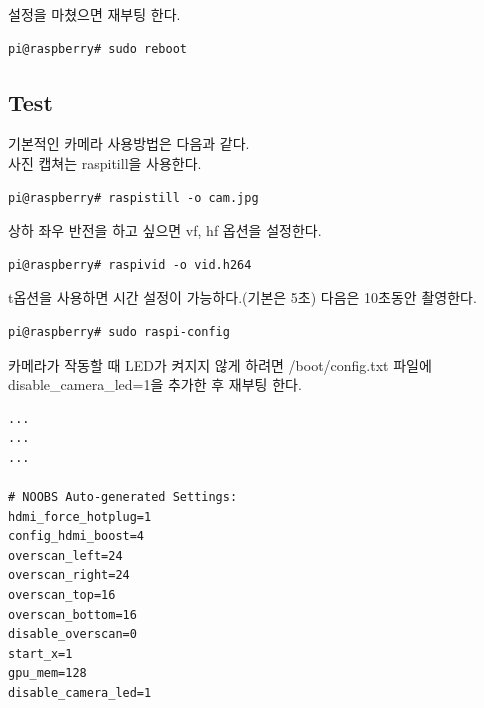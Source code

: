 \documentclass[11pt
  , a4paper
  , article
  , oneside
]{memoir}
\begin{document}
설정을 마쳤으면 재부팅 한다.
\begin{lstlisting}[style=termstyle]
pi@raspberry# sudo reboot
\end{lstlisting}
\subsection{Test}
기본적인 카메라 사용방법은 다음과 같다.\\
사진 캡쳐는 raspitill을 사용한다.
\begin{lstlisting}[style=termstyle]
pi@raspberry# raspistill -o cam.jpg
\end{lstlisting}
상하 좌우 반전을 하고 싶으면 vf, hf 옵션을 설정한다.
\begin{lstlisting}[style=termstyle]
pi@raspberry# raspivid -o vid.h264
\end{lstlisting}
t옵션을 사용하면 시간 설정이 가능하다.(기본은 5초) 다음은 10초동안 촬영한다.
\begin{lstlisting}[style=termstyle]
pi@raspberry# sudo raspi-config
\end{lstlisting}
카메라가 작동할 때 LED가 켜지지 않게 하려면 /boot/config.txt 파일에 disable\_camera\_led=1을 
추가한 후 재부팅 한다.
\begin{lstlisting}[style=termstyle]
...
...
...

# NOOBS Auto-generated Settings:
hdmi_force_hotplug=1
config_hdmi_boost=4
overscan_left=24
overscan_right=24
overscan_top=16
overscan_bottom=16
disable_overscan=0
start_x=1
gpu_mem=128
disable_camera_led=1
\end{lstlisting}
\end{document}
